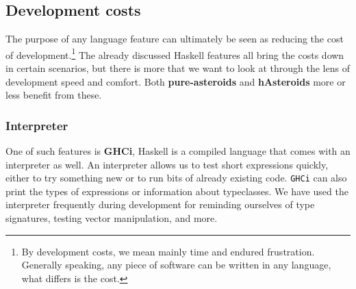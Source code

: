 \documentclass[
  digital, %
  color,   %
  table,   %
  oneside, %
  lof,     %
  lot,     %
]{fithesis3}
\begin{document}
{\subsection{Development costs}

The purpose of any language feature can ultimately be seen as reducing the cost of development.\footnote{
By development costs, we mean mainly time and endured frustration. Generally speaking,
any piece of software can be written in any language, what differs is the cost.
}
The already discussed Haskell features all bring the costs down in certain scenarios, but there is more
that we want to look at through the lens of development speed and comfort.
Both \textbf{pure-asteroids} and \textbf{hAsteroids} more or less benefit from these.

\subsubsection{Interpreter}
One of such features is \textbf{GHCi}, \cite{ghciwiki}
Haskell is a compiled language that comes with an interpreter as well.
An interpreter allows us to test short expressions quickly, either to try something new or to
run bits of already existing code. \texttt{GHCi} can also print the types of expressions
or information about typeclasses. We have used the interpreter frequently during development
for reminding ourselves of type signatures, testing vector manipulation, and more.


}
\end{document}
